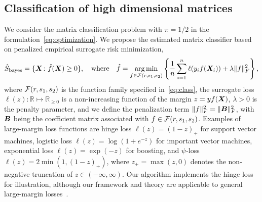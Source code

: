 \documentclass[12pt]{article}
\begin{document}
\subsection{Classification of high dimensional matrices}\label{subsec:pb1}
We consider the matrix classification problem with $\pi=1/2$ in the formulation~\eqref{eq:optimization}. We propose the estimated matrix classifier based on penalized empirical surrogate risk minimization,
\begin{align}\label{eq:large-margin}
\hat S_{\text{bayes}} = \{ \bm X\colon \hat f(\bm X)\geq 0\}, \quad \text{where}\quad \hat f =  \operatorname*{arg\,min}_{f\in\mathcal{F}(r,s_1,s_2)} \left\{ {1\over n}\sum_{i=1}^n \ell(y_i f(\bm X_i))+\lambda \lVert f\rVert_F^2\right\},
\end{align}
where $\mathcal{F}(r,s_1,s_2)$ is the function family specified in~\eqref{eq:class}, the surrogate loss $\ell(z)\colon \mathbb{R}\mapsto \mathbb{R}_{\geq 0}$ is a non-increasing function of the margin $z=yf(\bm X)$,  $\lambda>0$ is the penalty parameter, and we define the penalization term $\lVert f\rVert_F^2=\lVert\bm B\rVert_F^2$, with $\bm B$ being the coefficient matrix associated with $f\in\mathcal{F}(r,s_1,s_2)$.
Examples of large-margin loss functions are hinge loss $\ell(z) = (1-z)_+$ for support vector machines, logistic loss $\ell(z) =\log(1+e^{-z})$ for important vector machines, exponential loss $\ell(z)=\exp(-z)$ for boosting, and $\psi$-loss $\ell(z)=2\min(1,(1-z)_+)$, where $z_{+}=\max(z,0)$ denotes the non-negative truncation of $z\in(-\infty,\infty)$. Our algorithm implements the hinge loss for illustration, although our framework and theory are applicable to general large-margin losses~\citep{bartlett2006convexity}. 

\end{document}
